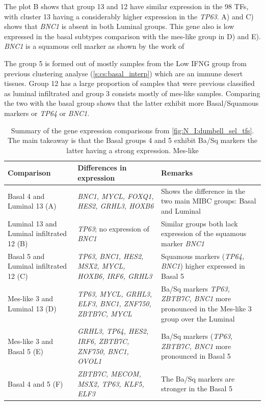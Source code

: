 The plot B shows that group 13 and 12 have similar expression in the 98 TFs, with cluster 13 having a considerably higher expression in the \textit{TP63}.  A) and C) shows that \textit{BNC1} is absent in both Luminal groups. This gene also is low expressed in the basal subtypes comparison with the mes-like group in D) and E). \textit{BNC1} is a squamous cell marker as shown by the work of \citet{Hurst2022-sp}

The group 5 is formed out of mostly samples from the Low IFNG group from previous clustering analyse (\cref{s:cs:basal_interp}) which are an immune desert tissues. Group 12 has a large proportion of samples that were previous classified as luminal infiltrated and group 3 consists mostly of mes-like samples. Comparing the two with the basal group shows that the latter exhibit more Basal/Squamous markers or \textit{TP64} or \textit{BNC1}.

\begin{table}[!t]
    \centering
    \scriptsize
    \begin{tabularx}{\textwidth}{>{\hsize=0.8\hsize}X|>{\hsize=0.8\hsize}X|>{\hsize=1.4\hsize}X}
        \toprule
        \textbf{Comparison} & \textbf{Differences in expression} & \textbf{Remarks} \\
        \midrule
        Basal 4 and Luminal 13 (A) & \textit{BNC1, MYCL, FOXQ1, HES2, GRHL3, HOXB6} & Shows the difference in the two main MIBC groups: Basal and Luminal \\
        \midrule
        Luminal 13 and Luminal infiltrated 12 (B) & \textit{TP63}; no expression of \textit{BNC1} & Similar groups both lack expression of the squamous marker \textit{BNC1} \\
        \midrule
        Basal 5 and Luminal infiltrated 12 (C) & \textit{TP63, BNC1, HES2, MSX2, MYCL, HOXB6, IRF6, GRHL3} & Squamous markers (\textit{TP64, BNC1}) higher expressed in Basal 5 \\
        \midrule
        Mes-like 3 and Luminal 13 (D) & \textit{TP63, MYCL, GRHL3, ELF3, BNC1, ZNF750, ZBTB7C, MYCL} & Ba/Sq markers \textit{TP63, ZBTB7C, BNC1} more pronounced in the Mes-like 3 group over the Luminal \\
        \midrule
        Mes-like 3 and  Basal 5 (E) & \textit{GRHL3, TP64, HES2, IRF6, ZBTB7C, ZNF750, BNC1, OVOL1} & Ba/Sq markers (\textit{TP63, ZBTB7C, BNC1} more pronounced in Basal 5 \\
        \midrule
        Basal 4 and 5 (F) & \textit{ZBTB7C, MECOM, MSX2, TP63, KLF5, ELF3} & The Ba/Sq markers are stronger in the Basal 5 \\
        \bottomrule
    \end{tabularx}
    \caption{Summary of the gene expression comparisons from \cref{fig:N_I:dumbell_sel_tfs}. The main takeaway is that the Basal groups 4 and 5 exhibit Ba/Sq markers the latter having a strong expression. Mes-like  }
    \label{tab:N_I:dumbel_summarry}
\end{table}

